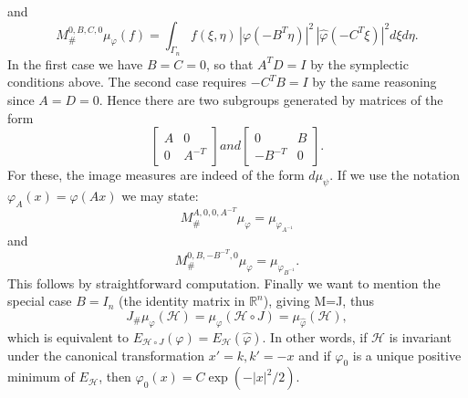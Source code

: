 \documentclass[12pt,a4paper]{article}
\newcommand{\RR}[1]{\mathbb{R}^#1}
\newcommand{\HH}{\mathcal{H}}
\begin{document}
and
\begin{displaymath}
       M^{0,B,C,0}_{\#}\mu_{\varphi}(f) =  \int_{\Gamma_n} f(\xi,\eta)\,
      |\varphi( - B^T \eta)|^2 \,
      |\hat\varphi(-C^T \xi)|^2 d\xi d\eta.
\end{displaymath}
In the first case we have $B=C=0$, so that $A^T D = I$ by the symplectic
conditions above. The second case requires $-C^T B=I$ by the same reasoning
since $A=D=0$. Hence there are two subgroups generated by matrices of the form
\begin{displaymath}
      \begin{bmatrix}
      A & 0 \\ 
      0 & A^{-T}
      \end{bmatrix}
and 
      \begin{bmatrix}
      0 & B \\ 
     -B^{-T} & 0
      \end{bmatrix}.        
\end{displaymath}
For these, the image measures are indeed of the form $d\mu_{\psi}$. If we use
the notation $\varphi_A(x)=\varphi(A x)$ we may state:
\begin{equation}
        M^{A,0,0,A^{-T}}_{\#}\mu_{\varphi} = \mu_{\varphi_{A^{-1}}}
\end{equation}
and
\begin{equation}
       M^{0,B,-B^{-T},0}_{\#}\mu_{\varphi} = \mu_{\widehat{\varphi_{B^{-1}}}}.
\end{equation}
This follows by straightforward computation. Finally we want to mention the 
special case $B=I_n$ (the identity matrix in $\RR n$), giving M=J, thus
\begin{displaymath}
        J_{\#}\mu_{\varphi}(\HH) = \mu_{\varphi}(\HH\circ J)=\mu_{\hat\varphi}(\HH),
\end{displaymath}
which is equivalent to $E_{\HH\circ J}(\varphi)=E_\HH({\hat\varphi})$. In other
words, if $\HH$ is invariant under the canonical transformation 
$x'=k, k'=-x$ and if $\varphi_0$ is a unique positive minimum of $E_\HH$, then 
$\varphi_0(x)=C \exp(-|x|^2/2)$.  
\end{document}
